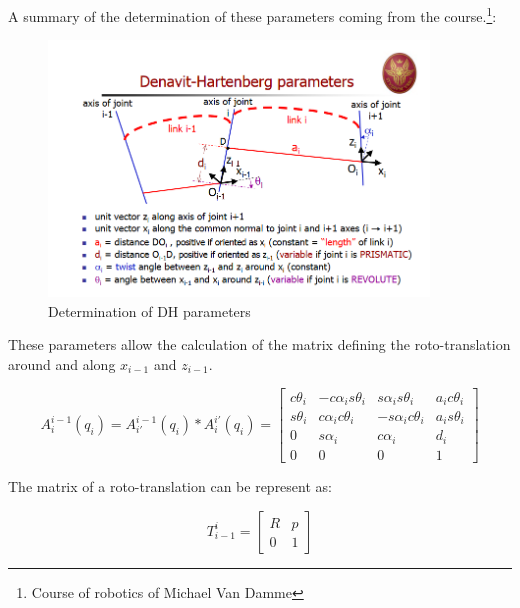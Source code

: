 \noindent A summary of the determination of these parameters coming from the course.\footnote{Course of robotics of Michael Van Damme}:

\vspace{1cm}

\begin{figure}[!h]
	\centering
    \includegraphics[width = 0.9\textwidth]{Images/DHparameters}
    \caption{Determination of DH parameters}
    \label{fig:DH}
\end{figure}

\noindent These parameters allow the calculation of the matrix defining the roto-translation around and along $x_{i-1}$ and $z_{i-1}$. \\

\begin{center}
	\begin{equation}
		A^{i-1}_{i}(q_i) = A^{i-1}_{i'}(q_i) * A^{i'}_{i}(q_i) = \begin{bmatrix}
		c\theta_i & -c\alpha_is\theta_i & s\alpha_is\theta_i & a_ic\theta_i \\
        s\theta_i & c\alpha_ic\theta_i & -s\alpha_ic\theta_i & a_is\theta_i \\
        0 & s \alpha_i & c \alpha_i & d_i\\
        0 & 0 & 0 & 1
		\end{bmatrix}
	\end{equation}
\end{center}


\noindent The matrix of a roto-translation can be represent as: \\
\begin{center}
	 \begin{equation}
	 	T^i_{i-1} = \begin{bmatrix}
	 	R & p\\ 0 & 1
	 	\end{bmatrix}
	 \end{equation}
\end{center}

